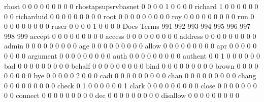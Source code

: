 \documentclass[compress,8pt]{beamer}
\begin{document}
\begin{frame}
\begin{Schunk}
  rhost                                      0   0   0   0   0   0   0   0   0
  rhostapsupsrvbasnet                        0   0   0   0   1   0   0   0   0
  richard                                    1   0   0   0   0   0   0   0   0
  richarduid                                 0   0   0   0   0   0   0   0   0
  root                                       0   0   0   0   0   0   0   0   0
  roy                                        0   0   0   0   0   0   0   0   0
  run                                        0   0   0   0   0   0   0   0   0
  ruser                                      0   0   0   0   1   0   0   0   0
                                          Docs
Terms                                      991 992 993 994 995 996 997 998 999
  accept                                     0   0   0   0   0   0   0   0   0
  access                                     0   0   0   0   0   0   0   0   0
  address                                    0   0   0   0   0   0   0   0   0
  admin                                      0   0   0   0   0   0   0   0   0
  age                                        0   0   0   0   0   0   0   0   0
  allow                                      0   0   0   0   0   0   0   0   0
  apr                                        0   0   0   0   0   0   0   0   0
  argument                                   0   0   0   0   0   0   0   0   0
  auth                                       0   0   0   0   0   0   0   0   0
  authent                                    0   0   1   0   0   0   0   0   0
  bad                                        0   0   0   0   0   0   0   0   0
  behalf                                     0   0   0   0   0   0   0   0   0
  bind                                       0   0   0   0   0   0   0   0   0
  brown                                      0   0   0   0   0   0   0   0   0
  bye                                        0   0   0   0   0   2   0   0   0
  cadi                                       0   0   0   0   0   0   0   0   0
  chan                                       0   0   0   0   0   0   0   0   0
  chang                                      0   0   0   0   0   0   0   0   0
  check                                      0   1   0   0   0   0   0   0   1
  clark                                      0   0   0   0   0   0   0   0   0
  close                                      0   0   0   0   0   0   0   0   0
  connect                                    0   0   0   0   0   0   0   0   0
  dec                                        0   0   0   0   0   0   0   0   0
  disallow                                   0   0   0   0   0   0   0   0   0

\end{Schunk}
\end{frame}
\end{document}
